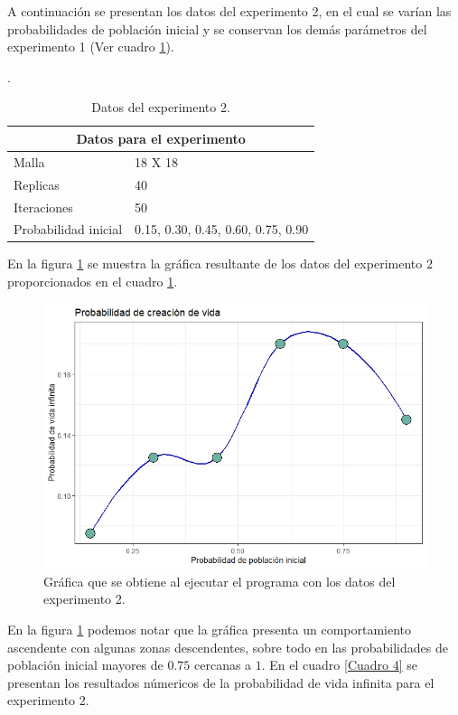 \documentclass{article}
\begin{document}
A continuación se presentan los datos del experimento 2, en el cual se varían las probabilidades de población inicial y se conservan los demás parámetros del experimento 1 (Ver cuadro \ref{Cuadro 3}).

\newpage
.
\bigskip

\begin{table}[ht]
\centering
\begin{tabular}{ |p{3cm}||p{5cm}|}
 \hline
 \multicolumn{2}{|c|}{Datos para el experimento} \\
 \hline
 Malla       & 18 X 18 \\
 \hline
 Replicas    & 40 \\
 \hline
 Iteraciones & 50 \\
 \hline
 Probabilidad inicial & 0.15, 0.30, 0.45, 0.60, 0.75, 0.90 \\
 \hline
\end{tabular}
\caption{Datos del experimento 2.}
\label{Cuadro 3}
\end{table}

En la figura \ref{Figura2} se muestra la gráfica resultante de los datos del experimento 2 proporcionados en el cuadro \ref{Cuadro 3}. 

\begin{figure} [h!]%
    \centering
    \includegraphics[width=150mm]{Figura2.jpeg} %
    \caption{Gráfica que se obtiene al ejecutar el programa con los datos del experimento 2.}
    \label{Figura2}
\end{figure}

En la figura \ref{Figura2} podemos notar que la gráfica presenta un comportamiento ascendente con algunas zonas descendentes, sobre todo en las probabilidades de población inicial mayores de $0.75$ cercanas a $1$. En el cuadro \ref{Cuadro 4} se presentan los resultados númericos de la probabilidad de vida infinita para el experimento 2.
\end{document}
